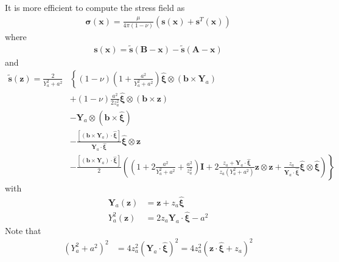 It is more efficient to compute the stress field as
\begin{align}
\bm\sigma(\bm x)=\frac{\mu}{4\pi(1-\nu)}\left(\bm s(\bm x)+\bm s^T(\bm x)\right)
\end{align}
where
\begin{align}
\bm s(\bm x)=\tilde {\bm s}(\bm B-\bm x)-\tilde {\bm s}(\bm A-\bm x)
\end{align}
and
\begin{align}
\tilde{\bm s}(\bm z)
=\frac{2}{Y_a^2+a^2}&
\left\{
(1-\nu)\left(1+\frac{a^2}{Y_a^2+a^2}\right)\hat{\bm\xi}\otimes\left(\bm b\times \bm Y_a\right)\right.\nonumber\\
&+(1-\nu)\frac{a^2}{2z_a^2 }\hat{\bm\xi}\otimes\left(\bm b\times \bm z\right)\nonumber\\
&-\bm Y_a\otimes\left(\bm b\times\hat{\bm \xi}\right)\nonumber\\
&-\frac{\left[\left(\bm b\times\bm Y_a\right)\cdot\hat{\bm \xi}\right]}{\bm Y_a\cdot \hat{\bm \xi}}\hat{\bm\xi}\otimes\bm z\nonumber\\
&\left.-\frac{\left[\left(\bm b\times\bm Y_a\right)\cdot\hat{\bm \xi}\right]}{2}\left(\left(1+2\frac{a^2}{Y_a^2+a^2}+\frac{a^2}{z_a^2 }\right)\bm I+2\frac{z_a+\bm Y_a\cdot \hat{\bm \xi}}{z_a(Y_a^2+a^2)}\bm z\otimes\bm z+\frac{z_a}{\bm Y_a\cdot \hat{\bm \xi}}\hat{\bm\xi}\otimes\hat{\bm\xi}\right)\right\}%
\end{align}
with
\begin{align}
\bm Y_a(\bm z)&=\bm z+z_a\hat{\bm\xi}\\
 Y^2_a(\bm z)&=2z_a\bm Y_a\cdot\hat{\bm \xi}-a^2
\end{align}
Note that
\begin{align}
\left( Y^2_a+a^2\right)^2&=4z_a^2\left(\bm Y_a\cdot\hat{\bm \xi}\right)^2=4z_a^2\left(\bm z\cdot\hat{\bm \xi}+z_a\right)^2
\end{align}

